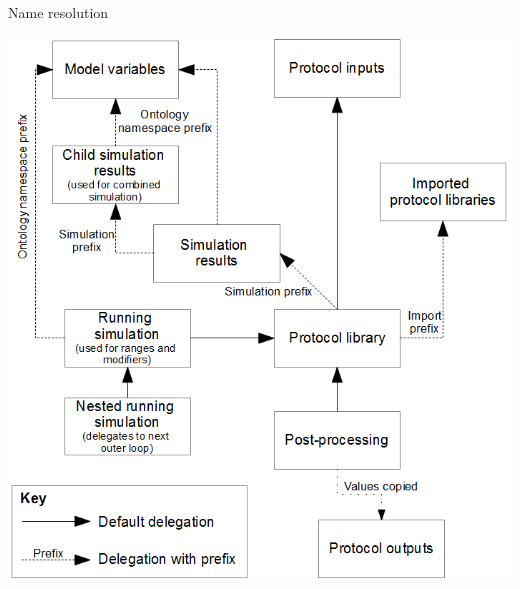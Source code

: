 \documentclass[t,xcolor={usenames,dvipsnames}]{beamer}
\begin{document}
\appendix


\begin{frame}{Name resolution}
\begin{center}
\vspace{-.5cm}
\includegraphics{Name_resolution}
\end{center}
\end{frame}
\end{document}

